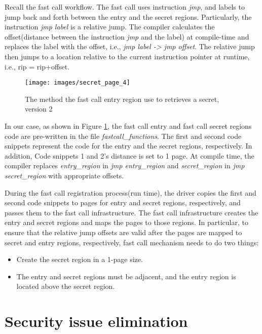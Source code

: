 Recall the fast call workflow. The fast call uses instruction \emph{jmp}, 
and labels to jump back and forth between the entry and the secret regions. 
Particularly, the instruction \emph{jmp label} is a relative jump. 
The compiler calculates the offset(distance between the instruction \emph{jmp}
and the label) at compile-time and replaces the label with the offset, i.e., 
\emph{jmp label -> jmp offset}. The relative jump then jumps to a location relative to the current 
instruction pointer at runtime, i.e., rip = rip+offset.
\begin{figure}[H]
  \centering
  \texttt{[image: images/secret\_page\_4]}
  \caption[Short description]{The method the fast call entry region use to retrieves a 
  secret, version 2}
   \label{fig:secret_page_4}
\end{figure}
In our case, as shown in Figure \ref{fig:secret_page_4},  the fast call entry and fast call 
secret regions code are pre-written in the file \emph{fastcall\_functions}. 
The first and second code snippets represent the code for the entry and 
the secret regions, respectively. In addition,  Code snippets 1 and 2's 
distance is set to 1 page.  At compile time, the compiler replaces
\emph{entry\_region} in \emph{jmp entry\_region} and \emph{secret\_region} in \emph{jmp secret\_region}  
with appropriate offsets.  



During the fast call registration process(run time), 
the driver copies the first and second code snippets to pages for entry and secret 
regions, respectively, and passes them to the fast call infrastructure. 
The fast call infrastructure creates the entry and secret regions and maps the 
pages to those regions.  In particular, to ensure that the relative jump 
offsets are valid after the pages are mapped to secret and entry regions, 
respectively, fast call mechanism needs to do two things:


\begin{itemize}
  \item Create the secret region in a 1-page size.
  \item The entry and secret regions must be adjacent, and the entry region is located above the secret region.
\end{itemize}


\section{Security issue elimination}

